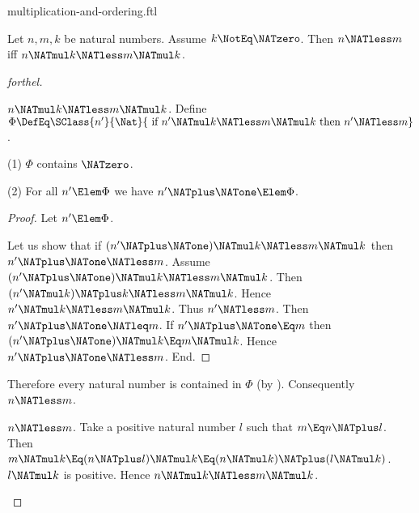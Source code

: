 \documentclass{stex}
\begin{document}
\begin{smodule}{multiplication-and-ordering.ftl}


\begin{proposition}[forthel,name=preservation of ordering under right-multiplication]
  Let $n, m, k$ be natural numbers.
  Assume $k \NotEq \NATzero$.
  Then $n \NATless m$ iff $n \NATmul k \NATless m \NATmul k$.
\end{proposition}
\begin{proof}[forthel]
  \begin{case}{$n \NATmul k \NATless m \NATmul k$.}
    Define $\Phi \DefEq \SClass{n'}{\Nat}{\text{ if }n' \NATmul k \NATless m \NATmul k\text{ then }n' \NATless m}$.

    (1) $\Phi$ contains $\NATzero$.

    (2) For all $n' \Elem \Phi$ we have $n' \NATplus \NATone \Elem \Phi$.
    \begin{proof}
      Let $n' \Elem \Phi$.

      Let us show that if $(n' \NATplus \NATone) \NATmul k \NATless m \NATmul k$ then $n' \NATplus \NATone \NATless m$.
        Assume $(n' \NATplus \NATone) \NATmul k \NATless m \NATmul k$.
        Then $(n' \NATmul k) \NATplus k \NATless m \NATmul k$.
        Hence $n' \NATmul k \NATless m \NATmul k$.
        Thus $n' \NATless m$.
        Then $n' \NATplus \NATone \NATleq m$.
        If $n' \NATplus \NATone \Eq m$ then $(n' \NATplus \NATone) \NATmul k \Eq m \NATmul k$.
        Hence $n' \NATplus \NATone \NATless m$.
      End.
    \end{proof}

    Therefore every natural number is contained in $\Phi$ (by ).
    Consequently $n \NATless m$.
  \end{case}

  \begin{case}{$n \NATless m$.}
    Take a positive natural number $l$ such that $m \Eq n \NATplus l$.
    Then $m \NATmul k \Eq (n \NATplus l) \NATmul k \Eq (n \NATmul k) \NATplus (l \NATmul k)$.
    $l \NATmul k$ is positive.
    Hence $n \NATmul k \NATless m \NATmul k$.
  \end{case}
\end{proof}



\end{smodule}
\end{document}
